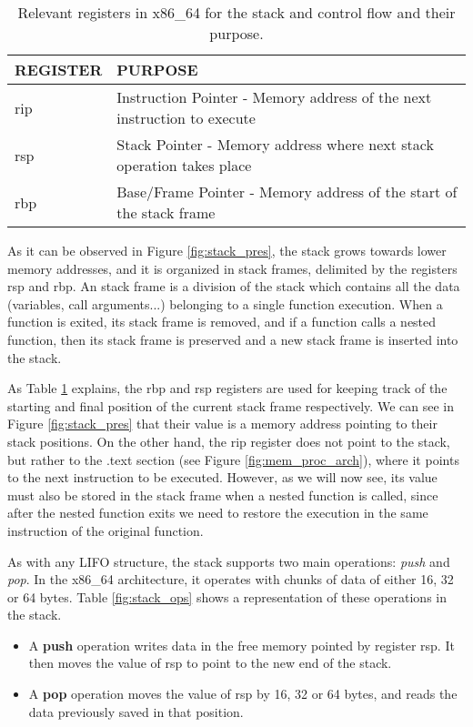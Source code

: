 \begin{table}[htbp]
\begin{tabular}{|>{\centering\arraybackslash}p{2cm}|>{\centering\arraybackslash}p{10cm}|}
\hline
\textbf{REGISTER} & \textbf{PURPOSE}\\
\hline
\hline
rip & Instruction Pointer - Memory address of the next instruction to execute\\
\hline
rsp & Stack Pointer - Memory address where next stack operation takes place\\
\hline
rbp & Base/Frame Pointer - Memory address of the start of the stack frame\\
\hline
\end{tabular}
\caption{Relevant registers in x86\_64 for the stack and control flow and their purpose.}
\label{table:systemv_abi_other}
\end{table}

As it can be observed in Figure \ref{fig:stack_pres}, the stack grows towards lower memory addresses, and it is organized in stack frames, delimited by the registers rsp and rbp. An stack frame is a division of the stack which contains all the data (variables, call arguments...) belonging to a single function execution. When a function is exited, its stack frame is removed, and if a function calls a nested function, then its stack frame is preserved and a new stack frame is inserted into the stack. 

As Table \ref{table:systemv_abi_other} explains, the rbp and rsp registers are used for keeping track of the starting and final position of the current stack frame respectively. We can see in Figure \ref{fig:stack_pres} that their value is a memory address pointing to their stack positions. On the other hand, the rip register does not point to the stack, but rather to the .text section (see Figure \ref{fig:mem_proc_arch}), where it points to the next instruction to be executed. However, as we will now see, its value must also be stored in the stack frame when a nested function is called, since after the nested function exits we need to restore the execution in the same instruction of the original function.

As with any LIFO structure, the stack supports two main operations: \textit{push} and \textit{pop}. In the x86\_64 architecture, it operates with chunks of data of either 16, 32 or 64 bytes. Table \ref{fig:stack_ops} shows a representation of these operations in the stack.
\begin{itemize}
\item A \textbf{push} operation writes data in the free memory pointed by register rsp. It then moves the value of rsp to point to the new end of the stack.
\item A \textbf{pop} operation moves the value of rsp by 16, 32 or 64 bytes, and reads the data previously saved in that position.
\end{itemize}

